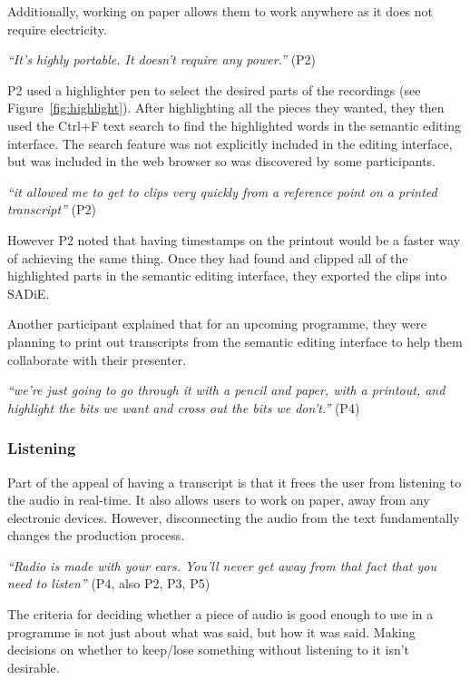 
Additionally, working on paper allows them to work anywhere as it does not require electricity.

\textit{``It's highly portable. It doesn't require any power.''} (P2)

P2 used a highlighter pen to select the desired parts of the recordings (see Figure~\ref{fig:highlight}).  After
highlighting all the pieces they wanted, they then used the Ctrl+F text search to find the highlighted words in the
semantic editing interface.  The search feature was not explicitly included in the editing interface, but was included
in the web browser so was discovered by some participants.

\textit{``it allowed me to get to clips very quickly from a reference point on a printed transcript''} (P2)

However P2 noted that having timestamps on the printout would be a faster way of achieving the same thing.  Once they
had found and clipped all of the highlighted parts in the semantic editing interface, they exported the clips into
SADiE.

Another participant explained that for an upcoming programme, they were planning to print out transcripts from the
semantic editing interface to help them collaborate with their presenter.

\textit{``we're just going to go through it with a pencil and paper, with a printout, and highlight the bits we want
  and cross out the bits we don't.''} (P4)

\subsubsection{Listening}
Part of the appeal of having a transcript is that it frees the user from listening to the audio in real-time. It also
allows users to work on paper, away from any electronic devices. However, disconnecting the audio from the text
fundamentally changes the production process.

\textit{``Radio is made with your ears. You'll never get away from that fact that you need to listen''} (P4, also P2,
P3, P5)

The criteria for deciding whether a piece of audio is good enough to use in a programme is not just about what was
said, but how it was said. Making decisions on whether to keep/lose something without listening to it isn't desirable.

